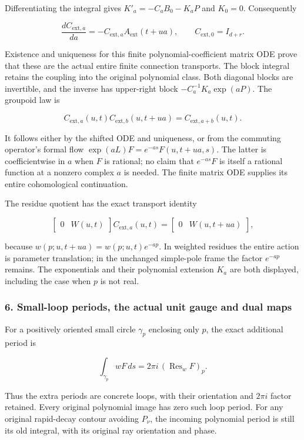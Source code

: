 Differentiating the integral gives \(K'_a=-C_a B_0-K_a P\) and \(K_0=0\). Consequently

\[
\frac{dC_{\mathrm{ext},a}}{da}
=-C_{\mathrm{ext},a}A_{\mathrm{ext}}(t+ua),
\qquad C_{\mathrm{ext},0}=I_{d+r}.
\tag{AP16}
\]

Existence and uniqueness for this finite polynomial-coefficient matrix ODE prove that these are the actual entire finite connection transports. The block integral retains the coupling into the original polynomial class. Both diagonal blocks are invertible, and the inverse has upper-right block \(-C_a^{-1}K_a\exp(aP)\). The groupoid law is

\[
C_{\mathrm{ext},a}(u,t)C_{\mathrm{ext},b}(u,t+ua)
=C_{\mathrm{ext},a+b}(u,t).
\tag{AP17}
\]

It follows either by the shifted ODE and uniqueness, or from the commuting operator's formal flow \(\exp(aL)F=e^{-as}F(u,t+ua,s)\). The latter is coefficientwise in \(a\) when \(F\) is rational; no claim that \(e^{-as}F\) is itself a rational function at a nonzero complex \(a\) is needed. The finite matrix ODE supplies its entire cohomological continuation.

The residue quotient has the exact transport identity

\[
\begin{bmatrix}0&W(u,t)\end{bmatrix}C_{\mathrm{ext},a}(u,t)
=\begin{bmatrix}0&W(u,t+ua)\end{bmatrix},
\tag{AP18}
\]

because \(w(p;u,t+ua)=w(p;u,t)e^{-ap}\). In weighted residues the entire action is parameter translation; in the unchanged simple-pole frame the factor \(e^{-ap}\) remains. The exponentials and their polynomial extension \(K_a\) are both displayed, including the case when \(p\) is not real.

\subsubsection{6. Small-loop periods, the actual unit gauge and dual maps}\label{endpoint-analytic_pole--small-loop-periods-the-actual-unit-gauge-and-dual-maps}

For a positively oriented small circle \(\gamma_p\) enclosing only \(p\), the exact additional period is

\[
\int_{\gamma_p}wF\,ds
=2\pi i\,(\operatorname{Res}_w F)_p.
\tag{AP19}
\]

Thus the extra periods are concrete loops, with their orientation and \(2\pi i\) factor retained. Every original polynomial image has zero such loop period. For any original rapid-decay contour avoiding \(P_\nu\), the incoming polynomial period is still its old integral, with its original ray orientation and phase.

